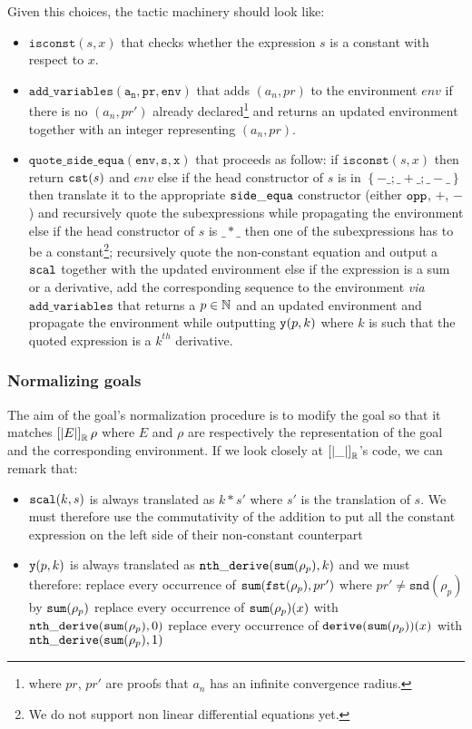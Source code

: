 \documentclass{article}
\begin{document}
Given this choices, the tactic machinery should look like:
\begin{itemize}
\item{$\mathtt{isconst}(s, x)$} that checks whether the expression $s$ is a constant
  with respect to $x$.

\item{$\mathtt{add\_variables(a_n, pr, env)}$} that adds $(a_n, pr)$ to the
  environment $env$ if there is no $(a_n, pr')$ already declared\footnote{where
  $pr$, $pr'$ are proofs that $a_n$ has an infinite convergence radius.}
  and returns an updated environment together with an integer representing
  $(a_n, pr)$.

\item{$\mathtt{quote\_side\_equa(env, s, x)}$} that proceeds as follow:
  \subitem if $\mathtt{isconst}(s, x)$ then return $\operatorname{\mathtt{cst}}(s)$ and $env$
  \subitem else if the head constructor of $s$ is in $\left\lbrace -\_; \_+\_;
   \_-\_\right\rbrace$ then translate it to the appropriate $\operatorname{\mathtt{side\_equa}}$ constructor
   (either $\operatorname{\mathtt{opp}}$, $\plus$, $\minus$) and recursively quote the subexpressions
    while propagating the environment
  \subitem else if the head constructor of $s$ is $\_*\_$ then one of the
   subexpressions has to be a constant\footnote{We do not support non linear
   differential equations yet.}; recursively quote the non-constant equation and
   output a $\operatorname{\mathtt{scal}}$ together with the updated environment
  \subitem else if the expression is a sum or a derivative, add the corresponding
   sequence to the environment \textit{via} $\mathtt{add\_variables}$ that returns
   a $p \in \mathbb{N}$ and an updated environment and propagate the environment while
   outputting $\operatorname{\mathtt{y}}(p,k)$ where $k$ is such that the quoted expression is a $k^{th}$
   derivative.
\end{itemize}

\subsubsection{Normalizing goals}

The aim of the goal's normalization procedure is to modify the goal so that it
matches $\left[\left| E \right|\right]_{\mathbb{R}} \rho$ where $E$ and $\rho$ are
respectively the representation of the goal and the corresponding environment.
If we look closely at $\left[\left| \_ \right|\right]_{\mathbb{R}}$'s code, we can remark
that:
\begin{itemize}
\item $\operatorname{\mathtt{scal}}(k,s)$ is always translated as $k * s'$ where $s'$ is the
  translation of $s$. We must therefore use the commutativity of the addition
  to put all the constant expression on the left side of their non-constant
  counterpart

\item $\operatorname{\mathtt{y}}(p,k)$ is always translated as $\operatorname{\mathtt{nth\_derive}}(\operatorname{\mathtt{sum}}(\rho_p),k)$ and we must
  therefore:
  \subitem replace every occurrence of $\operatorname{\mathtt{sum}} (\mathtt{fst} (\rho_p), pr')$ where
  $pr' \neq \mathtt{snd}(\rho_p)$ by $\operatorname{\mathtt{sum}}(\rho_p)$
  \subitem replace every occurrence of $\operatorname{\mathtt{sum}} (\rho_p)(x)$ with $\operatorname{\mathtt{nth\_derive}}(\operatorname{\mathtt{sum}}(\rho_p),0)$
  \subitem replace every occurrence of $\mathtt{derive}(\operatorname{\mathtt{sum}} (\rho_p))(x)$ with
  $\operatorname{\mathtt{nth\_derive}}(\operatorname{\mathtt{sum}}(\rho_p),1)$
\end{itemize}
\end{document}
